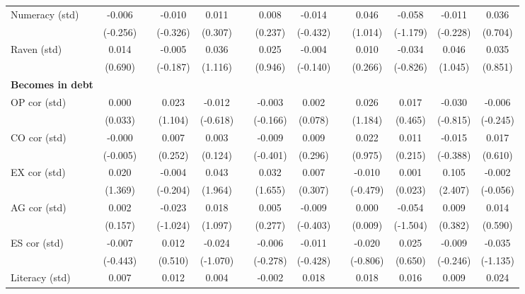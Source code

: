 \begin{table}[htbp]
{\begin{tabular}{lcccccccccccc}
    Numeracy (std) & -0.006 &       & -0.010 & 0.011 &       & 0.008 & -0.014 &       & 0.046 & -0.058 & -0.011 & 0.036 \\
          & (-0.256) &       & (-0.326) & (0.307) &       & (0.237) & (-0.432) &       & (1.014) & (-1.179) & (-0.228) & (0.704) \\
    Raven (std) & 0.014 &       & -0.005 & 0.036 &       & 0.025 & -0.004 &       & 0.010 & -0.034 & 0.046 & 0.035 \\
          & (0.690) &       & (-0.187) & (1.116) &       & (0.946) & (-0.140) &       & (0.266) & (-0.826) & (1.045) & (0.851) \\
    \midrule
    \textbf{Becomes in debt} &       &       &       &       &       &       &       &       &       &       &       &  \\
    OP cor (std) & 0.000 &       & 0.023 & -0.012 &       & -0.003 & 0.002 &       & 0.026 & 0.017 & -0.030 & -0.006 \\
          & (0.033) &       & (1.104) & (-0.618) &       & (-0.166) & (0.078) &       & (1.184) & (0.465) & (-0.815) & (-0.245) \\
    CO cor (std) & -0.000 &       & 0.007 & 0.003 &       & -0.009 & 0.009 &       & 0.022 & 0.011 & -0.015 & 0.017 \\
          & (-0.005) &       & (0.252) & (0.124) &       & (-0.401) & (0.296) &       & (0.975) & (0.215) & (-0.388) & (0.610) \\
    EX cor (std) & 0.020 &       & -0.004 & \cellcolor[rgb]{ 1,  1,  0}0.043 &       & \cellcolor[rgb]{ 1,  1,  0}0.032 & 0.007 &       & -0.010 & 0.001 & \cellcolor[rgb]{ 1,  1,  0}0.105 & -0.002 \\
          & (1.369) &       & (-0.204) & (1.964) &       & (1.655) & (0.307) &       & (-0.479) & (0.023) & (2.407) & (-0.056) \\
    AG cor (std) & 0.002 &       & -0.023 & 0.018 &       & 0.005 & -0.009 &       & 0.000 & -0.054 & 0.009 & 0.014 \\
          & (0.157) &       & (-1.024) & (1.097) &       & (0.277) & (-0.403) &       & (0.009) & (-1.504) & (0.382) & (0.590) \\
    ES cor (std) & -0.007 &       & 0.012 & -0.024 &       & -0.006 & -0.011 &       & -0.020 & 0.025 & -0.009 & -0.035 \\
          & (-0.443) &       & (0.510) & (-1.070) &       & (-0.278) & (-0.428) &       & (-0.806) & (0.650) & (-0.246) & (-1.135) \\
    Literacy (std) & 0.007 &       & 0.012 & 0.004 &       & -0.002 & 0.018 &       & 0.018 & 0.016 & 0.009 & 0.024 \\

\end{tabular}}
\end{table}
